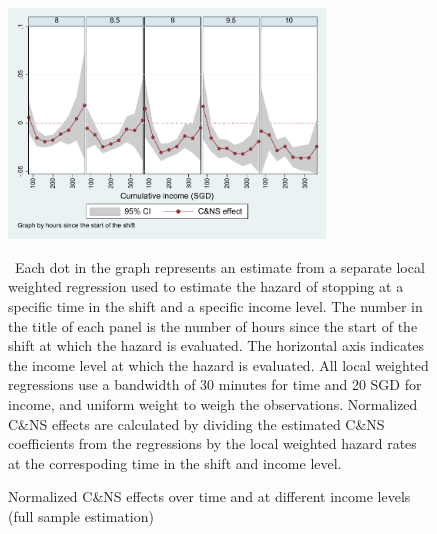 \documentclass[reviewmode,AEJ]{AEA}
\begin{document}
\begin{figure}
	{\centering
		\caption{Normalized C\&NS effects over time and at different income levels (full sample estimation)} %
		\includegraphics[width=0.75\textwidth]{./fg/cnsmfxulwr80to100.pdf}
		\label{fg:2dulwr}
	}
	\begin{figurenotes}
	\small\ Each dot in the graph represents an estimate from a separate local weighted regression used to estimate the hazard of stopping at a specific time in the shift and a specific income level. The number in the title of each panel is the number of hours since the start of the shift at which the hazard is evaluated. The horizontal axis indicates the income level at which the hazard is evaluated. All local weighted regressions use a bandwidth of 30 minutes for time and 20 SGD for income, and uniform weight to weigh the observations. Normalized C\&NS effects are calculated by dividing the estimated C\&NS coefficients from the regressions by the local weighted hazard rates at the correspoding time in the shift and income level. 
	\end{figurenotes}
\end{figure}

\FloatBarrier
\end{document}

